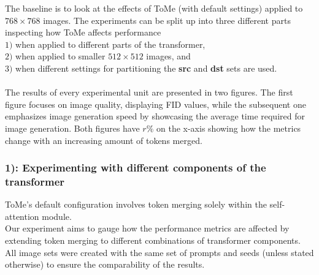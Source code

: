 The baseline is to look at the effects of ToMe (with default settings) applied to $768 \times 768$ images. The experiments can be split up into three different parts inspecting how ToMe affects performance\\ \(1)\) when applied to different parts of the transformer,\\ \(2)\) when applied to smaller $512 \times 512$ images, and\\ \(3)\) when different settings for partitioning the \textbf{src} and \textbf{dst} sets are used.\\
\\
The results of every experimental unit are presented in two figures. The first figure focuses on image quality, displaying FID values, while the subsequent one emphasizes image generation speed by showcasing the average time required for image generation.
Both figures have \(r\%\) on the x-axis showing how the metrics change with an increasing amount of tokens merged.

\subsubsection*{1): Experimenting with different components of the transformer}
ToMe's default configuration involves token merging solely within the self-attention module.\\
Our experiment aims to gauge how the performance metrics are affected by extending token merging to different combinations of transformer components.\\
All image sets were created with the same set of prompts and seeds (unless stated otherwise) to ensure the comparability of the results.



